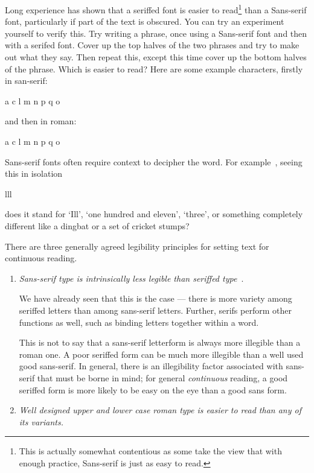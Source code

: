 \documentclass[10pt,a4paper,extrafontsizes]{memoir}
\begin{document}
\begin{paracol}{2}
Long experience has shown that a seriffed font is easier to 
read\footnote{This is actually somewhat contentious as some take the view
that with enough practice, Sans-serif is just as easy to read.}
than a
Sans-serif font, particularly if part of the text is obscured. You can
try an experiment yourself to verify this. Try writing a phrase, once
using a Sans-serif font and then with a serifed font. Cover up
the top halves of the two phrases and try to make out what they say. Then
repeat this, except this time cover up the bottom halves of the phrase.
Which is easier to read? Here are some example characters, firstly in san-serif:
\begin{center}
{\Huge\sffamily a c l m n p q o}
\end{center}
and then in roman:
\begin{center}
{\Huge a c l m n p q o}
\end{center}

    Sans-serif fonts often require context to decipher the word. 
For example~\autocite{MCLEAN80},
seeing this in isolation
\begin{center}
{\Huge\sffamily lll}
\end{center}
does it stand for `Ill', `one hundred and eleven', `three', or something
completely different like a dingbat or a set of cricket stumps?

    
    There are three generally agreed legibility 
principles for setting text for
continuous reading.

\begin{enumerate}
\item \emph{Sans-serif type is intrinsically less legible than seriffed type}~\autocite{WHEILDON95}.

    We have already seen that this is the case --- there is more variety
among seriffed letters than among sans-serif letters. Further, serifs
perform other functions as well, such as binding letters together within
a word.

    This is not to say that a sans-serif letterform is always more illegible
than a roman one. A poor seriffed form can be much more illegible than
a well used good sans-serif. In general, there is an illegibility factor
associated with sans-serif that must be borne in mind; for general
\emph{continuous} reading, a good seriffed form is more likely to be
easy on the eye than a good sans form.

\item \emph{Well designed upper and lower case roman type is easier to read than
any of its variants.}


\end{enumerate}
\end{paracol}
\end{document}
